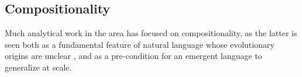 \subsection{Compositionality}


Much analytical work in the area has focused on compositionality, as the latter is seen both as a
fundamental feature of natural language whose evolutionary origins are
unclear \cite{Bickerton:2014,Townsend:etal:2018}, and as a pre-condition
for an emergent language to generalize at scale.


